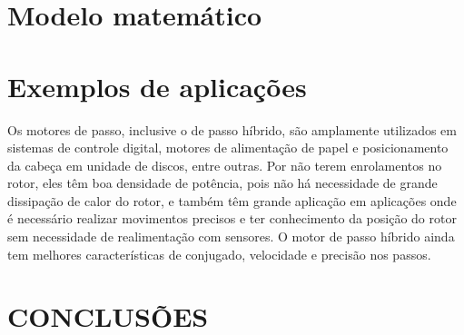 \documentclass[portugues]{sobraep}
\begin{document}
\section{Modelo matemático}

\section{Exemplos de aplicações}
Os motores de passo, inclusive o de passo híbrido, são amplamente utilizados em sistemas de controle digital, motores de alimentação de papel e posicionamento da cabeça em unidade de discos, entre outras. Por não terem enrolamentos no rotor, eles têm boa densidade de potência, pois não há necessidade de grande dissipação de calor do rotor, e também têm grande aplicação em aplicações onde é necessário realizar movimentos precisos e ter conhecimento da posição do rotor sem necessidade de realimentação com sensores. O motor de passo híbrido ainda tem melhores características de conjugado, velocidade e precisão nos passos. \cite{Fitz}

\section{CONCLUSÕES}





\end{document}

